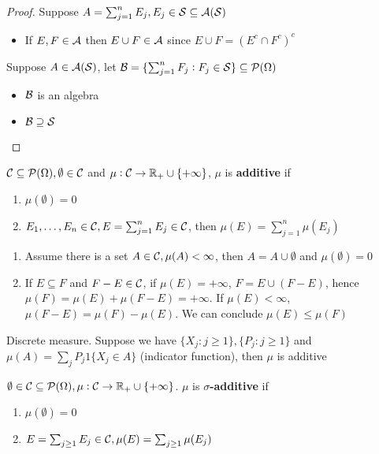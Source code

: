 \documentclass[11pt]{article}
\begin{document}
\begin{proof}
Suppose \(A=\sum_{j=1}^nE_j,E_j\in\mathcal{S}\subseteq \mathcal{A}(\mathcal{S})\)
\begin{itemize}
\item If \(E,F\in\mathcal{A}\) then \(E\cup F\in\mathcal{A}\) since \(E\cup F=(E^c\cap F^c)^c\)
\end{itemize}


Suppose \(A\in \mathcal{A}(\mathcal{S})\), let
\(\mathcal{B}=\{\sum_{j=1}^nF_j:F_j\in\mathcal{S}\}\subseteq\mathcal{P}(\Omega)\) 
\begin{itemize}
\item \(\mathcal{B}\) is an algebra
\item \(\mathcal{B}\supseteq\mathcal{S}\)
\end{itemize}
\end{proof}

\begin{definition}[]
\(\mathcal{C}\subseteq\mathcal{P}(\Omega),\emptyset\in\mathcal{C}\) and
\(\mu:\mathcal{C}\to\mathbb{R}_+\cup\{+\infty\}\), \(\mu\) is \textbf{additive} if
\begin{enumerate}
\item \(\mu(\emptyset)=0\)
\item \(E_1,\dots,E_n\in\mathcal{C},E=\sum_{j=1}^nE_j\in\mathcal{C}\), then
\(\mu(E)=\sum_{j=1}^n\mu(E_j)\)
\end{enumerate}
\end{definition}

\begin{remark}
\begin{enumerate}
\item Assume there is a set \(A\in\mathcal{C},\mu(A)<\infty\), then \(A=A\cup\emptyset\) and
\(\mu(\emptyset)=0\)
\item If \(E\subseteq F\) and \(F-E\in\mathcal{C}\), if \(\mu(E)=+\infty\), \(F=E\cup(F-E)\),
hence \(\mu(F)=\mu(E)+\mu(F-E)=+\infty\). If \(\mu(E)<\infty\), 
\(\mu(F-E)=\mu(F)-\mu(E)\). We can conclude \(\mu(E)\le\mu(F)\)
\end{enumerate}
\end{remark}

\begin{examplle}[]
Discrete measure. Suppose we have \(\{X_j:j\ge 1\},\{P_j:j\ge 1\}\)
and \(\mu(A)=\sum_{j}P_j1\{X_j\in A\}\) (indicator function), then \(\mu\) is
additive 
\end{examplle}

\begin{definition}[]
\(\emptyset\in\mathcal{C}\subseteq\mathcal{P}(\Omega),\mu:\mathcal{C}\to\mathbb{R}_+\cup\{+\infty\}\). \(\mu\) is
\textbf{\(\sigma\)-additive} if
\begin{enumerate}
\item \(\mu(\emptyset)=0\)
\item \(E=\sum_{j\ge 1}E_j\in\mathcal{C},\mu(E)=\sum_{j\ge 1}\mu(E_j)\)
\end{enumerate}
\end{definition}
\end{document}

